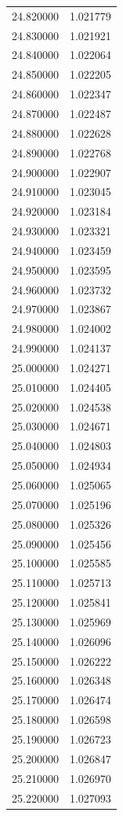 \begin{tabular}{rr}
24.820000 & 1.021779 \\
24.830000 & 1.021921 \\
24.840000 & 1.022064 \\
24.850000 & 1.022205 \\
24.860000 & 1.022347 \\
24.870000 & 1.022487 \\
24.880000 & 1.022628 \\
24.890000 & 1.022768 \\
24.900000 & 1.022907 \\
24.910000 & 1.023045 \\
24.920000 & 1.023184 \\
24.930000 & 1.023321 \\
24.940000 & 1.023459 \\
24.950000 & 1.023595 \\
24.960000 & 1.023732 \\
24.970000 & 1.023867 \\
24.980000 & 1.024002 \\
24.990000 & 1.024137 \\
25.000000 & 1.024271 \\
25.010000 & 1.024405 \\
25.020000 & 1.024538 \\
25.030000 & 1.024671 \\
25.040000 & 1.024803 \\
25.050000 & 1.024934 \\
25.060000 & 1.025065 \\
25.070000 & 1.025196 \\
25.080000 & 1.025326 \\
25.090000 & 1.025456 \\
25.100000 & 1.025585 \\
25.110000 & 1.025713 \\
25.120000 & 1.025841 \\
25.130000 & 1.025969 \\
25.140000 & 1.026096 \\
25.150000 & 1.026222 \\
25.160000 & 1.026348 \\
25.170000 & 1.026474 \\
25.180000 & 1.026598 \\
25.190000 & 1.026723 \\
25.200000 & 1.026847 \\
25.210000 & 1.026970 \\
25.220000 & 1.027093 \\

\end{tabular}
